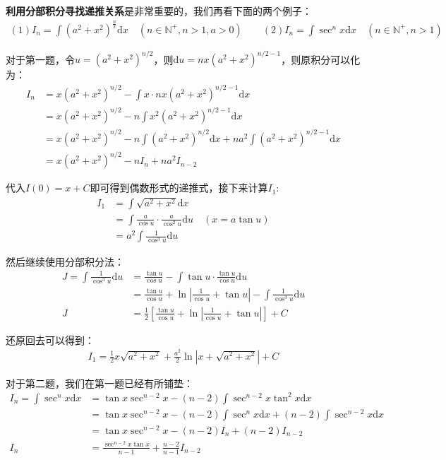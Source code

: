 \documentclass{ctexart}
\let\oldtextbf\textbf %
\renewcommand{\textbf}[1]{\textcolor{btex}{\oldtextbf{#1}}} %
\begin{document}
\textbf{利用分部积分寻找递推关系}是非常重要的，我们再看下面的两个例子：
\begin{align*}
    (1)I_n=\int (a^2+x^2)^\frac{n}{2}\mathrm{d}x\quad (n\in \mathbb{N^+},n>1,a>0)\qquad  (2)I_n=\int \sec^n x\mathrm{d}x\quad (n\in \mathbb{N^+},n>1)
\end{align*}

对于第一题，令$u=(a^2+x^2)^{n/2}$，则$\mathrm{d}u=nx(a^2+x^2)^{n/2-1}$，则原积分可以化为：
\begin{align*}
  I_n&=x(a^2+x^2)^{n/2}-\int x\cdot nx(a^2+x^2)^{n/2-1}\mathrm{d}x\\
&= x(a^2+x^2)^{n/2}-n\int x^2(a^2+x^2)^{n/2-1}\mathrm{d}x\\
&=x(a^2+x^2)^{n/2}-n\int (a^2+x^2)^{n/2}\mathrm{d}x+na^2\int (a^2+x^2)^{n/2-1}\mathrm{d}x\\
&=x(a^2+x^2)^{n/2}-n I_n+na^2I_{n-2}
\end{align*}

代入$I(0)=x+C$即可得到偶数形式的递推式，接下来计算$I_1$:
\begin{align*}
  I_1&=\int \sqrt{a^2+x^2}\mathrm{d}x \\
&=\int \frac{a}{\cos u}\cdot \frac{a}{\cos ^2u}\mathrm{d}u \quad (x=a\tan u)\\
&=a^2\int\frac{1}{\cos^3 u}\mathrm{d}u    
\end{align*}

然后继续使用分部积分法：
\begin{align*}
  J=\int\frac{1}{\cos^3 u}\mathrm{d}u  &=\frac{\tan u}{\cos u}-\int\tan u\cdot \frac{\tan u}{\cos u}\mathrm{d}u\\
&=\frac{\tan u}{\cos u}+\ln|\frac{1}{\cos u}+\tan u|-\int\frac{1}{\cos^3 u}\mathrm{d}u\\
J&=\frac{1}{2}\left[\frac{\tan u}{\cos u}+\ln|\frac{1}{\cos u}+\tan u|\right]+C          
\end{align*}

还原回去可以得到：
\begin{align*}
    I_1=\frac{1}{2}x\sqrt{a^2+x^2}+\frac{a^2}{2}\ln|x+\sqrt{a^2+x^2}|+C
\end{align*}

对于第二题，我们在第一题已经有所铺垫：
\begin{align*}
  I_n=\int \sec^nx\mathrm{d}x&=\tan x\sec^{n-2}x-(n-2)\int\sec^{n-2}x\tan^2x\mathrm{d}x\\
&=\tan x\sec^{n-2}x-(n-2)\int\sec^nx\mathrm{d}x+(n-2) \int\sec^{n-2}x\mathrm{d}x\\
&=\tan x\sec^{n-2}x-(n-2)I_n+(n-2)I_{n-2}\\
I_n&=\frac{\sec^{n-2}x\tan x}{n-1}+\frac{n-2}{n-1}I_{n-2}
\end{align*}
\end{document}
